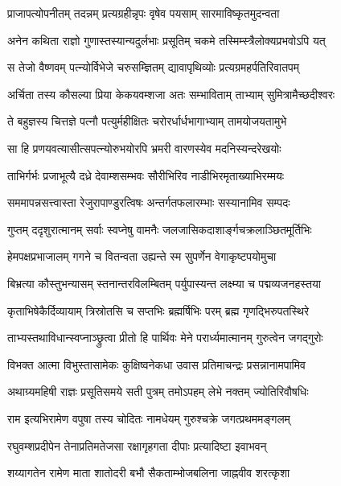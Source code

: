 \twolineshloka
{प्राजापत्योपनीतम् तदन्नम् प्रत्यग्रहीन्नृपः}
{वृषेव पयसाम् सारमाविष्कृतमुदन्वता} %

\twolineshloka
{अनेन कथिता राज्ञो गुणास्तस्यान्यदुर्लभाः}
{प्रसूतिम् चकमे तस्मिम्स्त्रैलोक्यप्रभवोऽपि यत्} %

\twolineshloka
{स तेजो वैष्णवम् पत्न्योर्विभेजे चरुसम्ज्ञितम्}
{द्यावापृथिव्योः प्रत्यग्रमहर्पतिरिवातपम्} %

\twolineshloka
{अर्चिता तस्य कौसल्या प्रिया केकयवम्शजा}
{अतः सम्भाविताम् ताभ्याम् सुमित्रामैच्छदीश्वरः} %

\twolineshloka
{ते बहुज्ञस्य चित्तज्ञे पत्नौ पत्युर्महीक्षितः}
{चरोरर्धार्धभागाभ्याम् तामयोजयतामुभे} %

\twolineshloka
{सा हि प्रणयवत्यासीत्सपत्न्योरुभयोरपि}
{भ्रमरी वारणस्येव मदनिस्यन्दरेखयोः} %

\twolineshloka
{ताभिर्गर्भः प्रजाभूत्यै दध्रे देवाम्शसम्भवः}
{सौरीभिरिव नाडीभिरमृताख्याभिरम्मयः} %

\twolineshloka
{सममापन्नसत्त्वास्ता रेजुरापाण्डुरत्विषः}
{अन्तर्गतफलारम्भाः सस्यानामिव सम्पदः} %

\twolineshloka
{गुप्तम् ददृशुरात्मानम् सर्वाः स्वप्नेषु वामनैः}
{जलजासिकदाशार्ङ्गचक्रलाञ्छितमूर्तिभिः} %

\twolineshloka
{हेमपक्षप्रभाजालम् गगने च वितन्वता}
{उह्यन्ते स्म सुपर्णेन वेगाकृष्टपयोमुचा} %

\twolineshloka
{बिभ्रत्या कौस्तुभन्यासम् स्तनान्तरविलम्बितम्}
{पर्युपास्यन्त लक्ष्म्या च पद्मव्यजनहस्तया} %

\twolineshloka
{कृताभिषेकैर्दिव्यायाम् त्रिस्रोतसि च सप्तभिः}
{ब्रह्मर्षिभिः परम् ब्रह्म गृणद्भिरुपतस्थिरे} %

\twolineshloka
{ताभ्यस्तथाविधान्स्वप्नाञ्छ्रुत्वा प्रीतो हि पार्थिवः}
{मेने परार्ध्यमात्मानम् गुरुत्वेन जगद्गुरोः} %

\twolineshloka
{विभक्त आत्मा विभुस्तासामेकः कुक्षिष्वनेकधा}
{उवास प्रतिमाचन्द्रः प्रसन्नानामपामिव} %

\twolineshloka
{अथाग्र्यमहिषी राज्ञः प्रसूतिसमये सती}
{पुत्रम् तमोऽपहम् लेभे नक्तम् ज्योतिरिवौषधिः} %

\twolineshloka
{राम इत्यभिरामेण वपुषा तस्य चोदितः}
{नामधेयम् गुरुश्चक्रे जगत्प्रथममङ्गलम्} %

\twolineshloka
{रघुवम्शप्रदीपेन तेनाप्रतिमतेजसा}
{रक्षागृहगता दीपाः प्रत्यादिष्टा इवाभवन्} %

\twolineshloka
{शय्यागतेन रामेण माता शातोदरी बभौ}
{सैकताम्भोजबलिना जाह्नवीव शरत्कृशा} %

